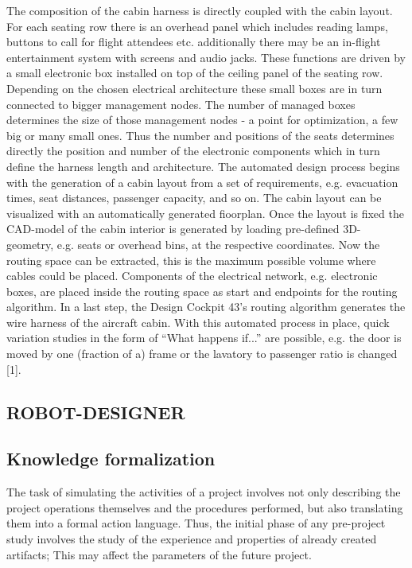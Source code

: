 \documentclass[8pt,twocolumn]{article}
\begin{document}
The composition of the cabin harness is directly coupled with the cabin layout. For each seating row there is an overhead panel which includes reading lamps, buttons to call for flight attendees etc. additionally there may be an in-flight entertainment system with screens and audio jacks. These functions are driven by a small electronic box installed on top of the ceiling panel of the seating row. Depending on the chosen electrical architecture these small boxes are in turn connected to bigger management nodes. The number of managed boxes determines the size of those management nodes - a point for optimization, a few big or many small ones. Thus the number and positions of the seats determines directly the position and number of the electronic components which in turn define the harness length and architecture. The automated design process begins with the generation of a cabin layout from a set of requirements, e.g. evacuation times, seat distances, passenger capacity, and so on. The cabin layout can be visualized with an automatically generated fioorplan. Once the layout is fixed the CAD-model of the cabin interior is generated by loading pre-defined 3D-geometry, e.g. seats or overhead bins, at the respective coordinates. Now the routing space can be extracted, this is the maximum possible volume where cables could be placed. Components of the electrical network, e.g. electronic boxes, are placed inside the routing space as start and endpoints for the routing algorithm. In a last step, the Design Cockpit 43’s routing algorithm generates the wire harness of the aircraft cabin. With this automated process in place, quick variation studies in the form of “What happens if...” are possible, e.g. the door is moved by one (fraction of a) frame or the lavatory to passenger ratio is changed [1].

\begin{center}
\section{ROBOT-DESIGNER}
\end{center}
\subsection{Knowledge formalization}
The task of simulating the activities of a project involves not only describing the project operations themselves and the procedures performed, but also translating them into a formal action language. Thus, the initial phase of any pre-project study involves the study of the experience and properties of already created artifacts; This may affect the parameters of the future project.
\end{document}
